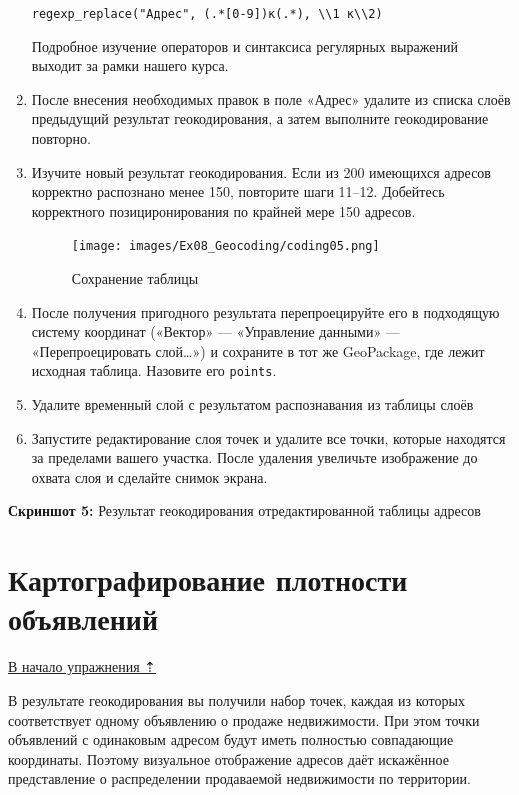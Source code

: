 \documentclass[
  12pt,
]{book}
\begin{document}
\begin{enumerate}
  \texttt{regexp\_replace("Адрес",\ \textquotesingle{}(.*{[}0-9{]})к(.*)\textquotesingle{},\ \textquotesingle{}\textbackslash{}\textbackslash{}1\ к\textbackslash{}\textbackslash{}2\textquotesingle{})}

  Подробное изучение операторов и синтаксиса регулярных выражений выходит за рамки нашего курса.
\item
  После внесения необходимых правок в поле «Адрес» удалите из списка слоёв предыдущий результат геокодирования, а затем выполните геокодирование повторно.
\item
  Изучите новый результат геокодирования. Если из 200 имеющихся адресов корректно распознано менее 150, повторите шаги 11--12. Добейтесь корректного позициронирования по крайней мере 150 адресов.

  \begin{figure}
  \centering
  \texttt{[image: images/Ex08\_Geocoding/coding05.png]}
  \caption{Сохранение таблицы}
  \end{figure}
\item
  После получения пригодного результата перепроецируйте его в подходящую систему координат («Вектор» --- «Управление данными» --- «Перепроецировать слой\ldots») и сохраните в тот же GeoPackage, где лежит исходная таблица. Назовите его \texttt{points}.
\item
  Удалите временный слой с результатом распознавания из таблицы слоёв
\item
  Запустите редактирование слоя точек и удалите все точки, которые находятся за пределами вашего участка. После удаления увеличьте изображение до охвата слоя и сделайте снимок экрана.
\end{enumerate}

\textbf{Скриншот 5:} Результат геокодирования отредактированной таблицы адресов

\hypertarget{geocoding-mapping}{%
\section{Картографирование плотности объявлений}\label{geocoding-mapping}}

\protect\hyperlink{geocoding}{В начало упражнения ⇡}

В результате геокодирования вы получили набор точек, каждая из которых соответствует одному объявлению о продаже недвижимости. При этом точки объявлений с одинаковым адресом будут иметь полностью совпадающие координаты. Поэтому визуальное отображение адресов даёт искажённое представление о распределении продаваемой недвижимости по территории.
\end{document}
